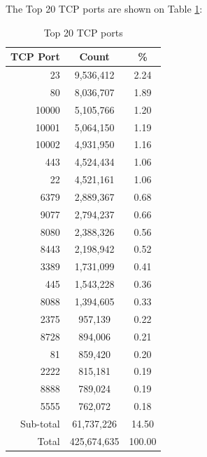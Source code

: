 \newpage
The Top 20 TCP ports are shown on Table \ref{tab:top20tcpports}:
\begin{table}[!h]
\begin{center}
\caption{Top 20 TCP ports}
\label{tab:top20tcpports}
\begin{tabular}{ |r|c|c| }
\hline
\centering TCP Port & Count & \%  \\
\hline
23 & 9,536,412 & 2.24  \\
80 & 8,036,707 & 1.89  \\
10000 & 5,105,766 & 1.20  \\
10001 & 5,064,150 & 1.19  \\
10002 & 4,931,950 & 1.16  \\
443 & 4,524,434 & 1.06  \\
22 & 4,521,161 & 1.06  \\
6379 & 2,889,367 & 0.68  \\
9077 & 2,794,237 & 0.66  \\
8080 & 2,388,326 & 0.56  \\
8443 & 2,198,942 & 0.52  \\
3389 & 1,731,099 & 0.41  \\
445 & 1,543,228 & 0.36  \\
8088 & 1,394,605 & 0.33  \\
2375 & 957,139 & 0.22  \\
8728 & 894,006 & 0.21  \\
81 & 859,420 & 0.20  \\
2222 & 815,181 & 0.19  \\
8888 & 789,024 & 0.19  \\
5555 & 762,072 & 0.18  \\
\hline
Sub-total & 61,737,226 & 14.50  \\
\hline
Total & 425,674,635 & 100.00  \\
\hline
\end{tabular}
\end{center}
\end{table}

